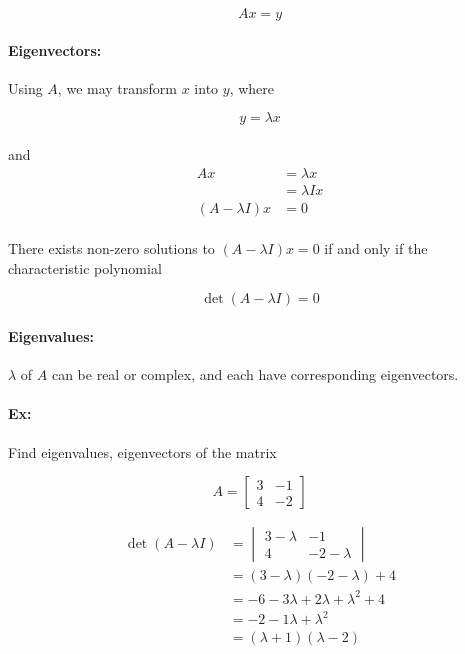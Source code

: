 \documentclass{article}
\begin{document}
\[
    Ax = y
\]

\paragraph{Eigenvectors:} Using $A$, we may transform $x$ into $y$, where

\[
    y = \lambda x
\]
\paragraph{}and
\begin{align*}
    Ax &= \lambda x\\
       &= \lambda I x\\
    (A-\lambda I)x &= 0
\end{align*}
\paragraph{}There exists non-zero solutions to $(A-\lambda I)x = 0$ if and only if the
characteristic polynomial


\[
    \det (A-\lambda I) = 0
\]

\paragraph{Eigenvalues:} $\lambda$ of $A$ can be real or complex, and each have corresponding
eigenvectors.

\paragraph{Ex:} Find eigenvalues, eigenvectors of the matrix 


\[
    A=
\begin{bmatrix}
    3&-1\\
    4&-2
\end{bmatrix}
\]

\begin{align*}
    \det(A-\lambda I) &= 
\begin{vmatrix}
    3-\lambda&-1\\
    4&-2-\lambda
\end{vmatrix}\\
                      &= (3-\lambda)(-2-\lambda)+4\\
                      &= -6 -3\lambda +2\lambda + \lambda^2 + 4\\
                      &= -2 -1\lambda + \lambda^2 \\
                      &= (\lambda+1)(\lambda-2)
\end{align*}
\end{document}
